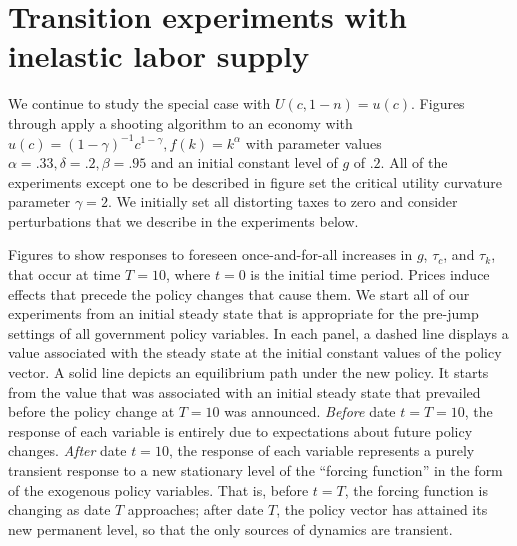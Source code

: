 


\section{Transition experiments with inelastic labor supply}\label{sec:transinelastic}%
We continue to study the special case with $U(c,1-n)=u(c)$.
  Figures  through  apply a  %
shooting algorithm to an economy with
$u(c) = (1-\gamma)^{-1} c^{1-\gamma}, f(k) = k^\alpha$
with parameter values $\alpha=.33, \delta = .2,  \beta=.95 $ and an initial
constant level of $g$ of $.2$.  All of the experiments except one to be described in figure  set the critical utility curvature parameter
 $\gamma=2$.   We initially set all distorting taxes to
zero and consider perturbations  that we describe in the experiments
below.  %

  Figures  to   show responses to foreseen once-and-for-all increases
in $g$, $\tau_c$,  and $\tau_k$, that occur at time
$T=10$, where $t=0$ is the initial time period.  Prices induce
effects that precede the policy changes that cause them. We start
all of our experiments from an initial steady state that is
appropriate for the pre-jump settings of all government policy
variables. In each panel, a dashed line displays a value
associated with the steady state at the initial constant values of
the policy vector. A solid line depicts an equilibrium path under
the new policy. It starts from the value that was associated with
an initial steady state that prevailed before the policy change at
$T=10$ was announced.  {\it Before\/} date $t= T= 10$, the
response of each variable is entirely due to expectations about
future policy changes. {\it After\/} date $t=10$, the response of
each variable represents a purely transient response to a new
stationary level of the ``forcing function'' in the form of the
exogenous policy variables. That is, before  $t=T$, the forcing
function is changing as date $T$ approaches; after date $T$, the
policy vector has attained its new permanent level, so that the
only sources of dynamics are transient.

